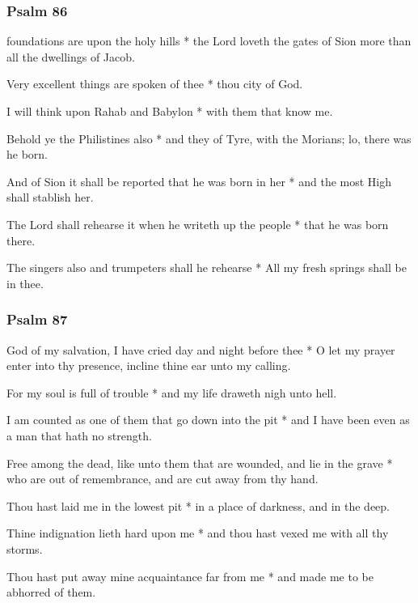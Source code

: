 \subsubsection{Psalm 86}


 foundations are upon the holy hills * the Lord loveth the gates of Sion more than all the dwellings of Jacob.

Very excellent things are spoken of thee * thou city of God.

I will think upon Rahab and Babylon * with them that know me.

Behold ye the Philistines also * and they of Tyre, with the Morians; lo, there was he born.

And of Sion it shall be reported that he was born in her * and the most High shall stablish her.

The Lord shall rehearse it when he writeth up the people * that he was born there.

The singers also and trumpeters shall he rehearse * All my fresh springs shall be in thee.

\subsubsection{Psalm 87}


 God of my salvation, I have cried day and night before thee * O let my prayer enter into thy presence, incline thine ear unto my calling.

For my soul is full of trouble * and my life draweth nigh unto hell.

I am counted as one of them that go down into the pit * and I have been even as a man that hath no strength.

Free among the dead, like unto them that are wounded, and lie in the grave * who are out of remembrance, and are cut away from thy hand.

Thou hast laid me in the lowest pit * in a place of darkness, and in the deep.

Thine indignation lieth hard upon me * and thou hast vexed me with all thy storms.

Thou hast put away mine acquaintance far from me * and made me to be abhorred of them.

